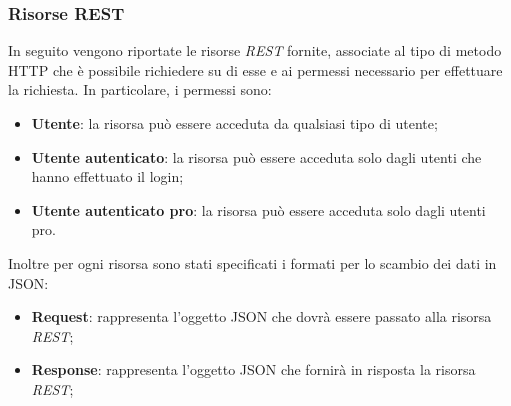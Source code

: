 \subsubsection{Risorse REST}
In seguito vengono riportate le risorse \textit{REST} fornite, associate al tipo di metodo HTTP che è possibile richiedere su di esse e ai permessi necessario per effettuare la richiesta. In particolare, i permessi sono:
\begin{itemize}
	\item \textbf{Utente}: la risorsa può essere acceduta da qualsiasi tipo di utente;
	\item \textbf{Utente autenticato}: la risorsa può essere acceduta solo dagli utenti che hanno effettuato il login;
	\item \textbf{Utente autenticato pro}: la risorsa può essere acceduta solo dagli utenti pro.
\end{itemize}
Inoltre per ogni risorsa sono stati specificati i formati per lo scambio dei dati in JSON:
\begin{itemize}
	\item \textbf{Request}: rappresenta l'oggetto JSON che dovrà essere passato alla risorsa \textit{REST};
	\item \textbf{Response}: rappresenta l'oggetto JSON che fornirà in risposta la risorsa \textit{REST};
	
	
	
	
	
	
	
	
	
	
	
	
	
		
	
	
	
	
	
	
	
	
	
	
\end{itemize}